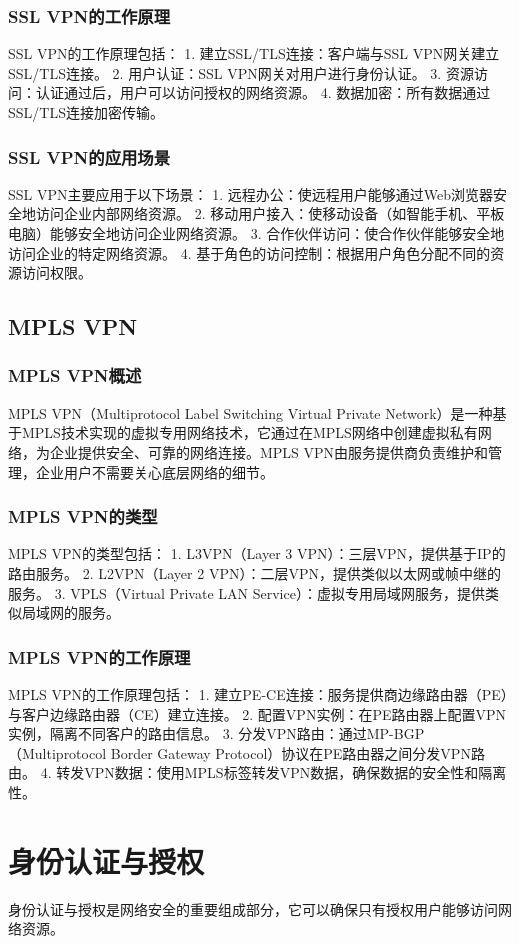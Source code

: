 \documentclass{book}
\begin{document}
\subsubsection{SSL VPN的工作原理}
SSL VPN的工作原理包括：
1. 建立SSL/TLS连接：客户端与SSL VPN网关建立SSL/TLS连接。
2. 用户认证：SSL VPN网关对用户进行身份认证。
3. 资源访问：认证通过后，用户可以访问授权的网络资源。
4. 数据加密：所有数据通过SSL/TLS连接加密传输。
\subsubsection{SSL VPN的应用场景}
SSL VPN主要应用于以下场景：
1. 远程办公：使远程用户能够通过Web浏览器安全地访问企业内部网络资源。
2. 移动用户接入：使移动设备（如智能手机、平板电脑）能够安全地访问企业网络资源。
3. 合作伙伴访问：使合作伙伴能够安全地访问企业的特定网络资源。
4. 基于角色的访问控制：根据用户角色分配不同的资源访问权限。
\subsection{MPLS VPN}
\subsubsection{MPLS VPN概述}
MPLS VPN（Multiprotocol Label Switching Virtual Private Network）是一种基于MPLS技术实现的虚拟专用网络技术，它通过在MPLS网络中创建虚拟私有网络，为企业提供安全、可靠的网络连接。MPLS VPN由服务提供商负责维护和管理，企业用户不需要关心底层网络的细节。
\subsubsection{MPLS VPN的类型}
MPLS VPN的类型包括：
1. L3VPN（Layer 3 VPN）：三层VPN，提供基于IP的路由服务。
2. L2VPN（Layer 2 VPN）：二层VPN，提供类似以太网或帧中继的服务。
3. VPLS（Virtual Private LAN Service）：虚拟专用局域网服务，提供类似局域网的服务。
\subsubsection{MPLS VPN的工作原理}
MPLS VPN的工作原理包括：
1. 建立PE-CE连接：服务提供商边缘路由器（PE）与客户边缘路由器（CE）建立连接。
2. 配置VPN实例：在PE路由器上配置VPN实例，隔离不同客户的路由信息。
3. 分发VPN路由：通过MP-BGP（Multiprotocol Border Gateway Protocol）协议在PE路由器之间分发VPN路由。
4. 转发VPN数据：使用MPLS标签转发VPN数据，确保数据的安全性和隔离性。
\section{身份认证与授权}
身份认证与授权是网络安全的重要组成部分，它可以确保只有授权用户能够访问网络资源。
\end{document}
